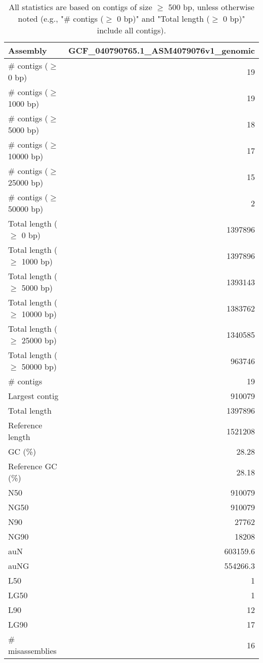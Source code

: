\documentclass[12pt,a4paper]{article}
\begin{document}
\begin{table}[ht]
\begin{center}
\caption{All statistics are based on contigs of size $\geq$ 500 bp, unless otherwise noted (e.g., "\# contigs ($\geq$ 0 bp)" and "Total length ($\geq$ 0 bp)" include all contigs).}
\begin{tabular}{|l*{1}{|r}|}
\hline
Assembly & GCF\_040790765.1\_ASM4079076v1\_genomic \\ \hline
\# contigs ($\geq$ 0 bp) & 19 \\ \hline
\# contigs ($\geq$ 1000 bp) & 19 \\ \hline
\# contigs ($\geq$ 5000 bp) & 18 \\ \hline
\# contigs ($\geq$ 10000 bp) & 17 \\ \hline
\# contigs ($\geq$ 25000 bp) & 15 \\ \hline
\# contigs ($\geq$ 50000 bp) & 2 \\ \hline
Total length ($\geq$ 0 bp) & 1397896 \\ \hline
Total length ($\geq$ 1000 bp) & 1397896 \\ \hline
Total length ($\geq$ 5000 bp) & 1393143 \\ \hline
Total length ($\geq$ 10000 bp) & 1383762 \\ \hline
Total length ($\geq$ 25000 bp) & 1340585 \\ \hline
Total length ($\geq$ 50000 bp) & 963746 \\ \hline
\# contigs & 19 \\ \hline
Largest contig & 910079 \\ \hline
Total length & 1397896 \\ \hline
Reference length & 1521208 \\ \hline
GC (\%) & 28.28 \\ \hline
Reference GC (\%) & 28.18 \\ \hline
N50 & 910079 \\ \hline
NG50 & 910079 \\ \hline
N90 & 27762 \\ \hline
NG90 & 18208 \\ \hline
auN & 603159.6 \\ \hline
auNG & 554266.3 \\ \hline
L50 & 1 \\ \hline
LG50 & 1 \\ \hline
L90 & 12 \\ \hline
LG90 & 17 \\ \hline
\# misassemblies & 16 \\ \hline

\end{tabular}
\end{center}
\end{table}
\end{document}
